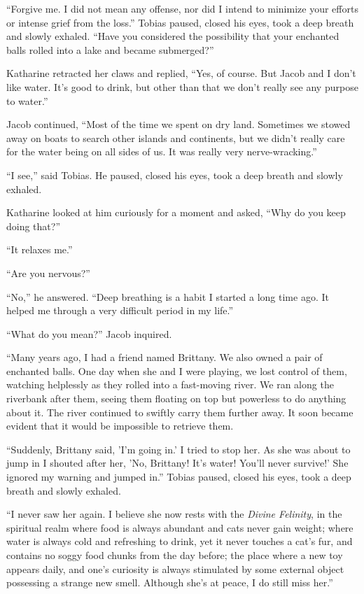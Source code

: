 “Forgive me. I did not mean any offense, nor did I intend to minimize your efforts or intense grief from the loss.” Tobias paused, closed his eyes, took a deep breath and slowly exhaled. “Have you considered the possibility that your enchanted balls rolled into a lake and became submerged?”

Katharine retracted her claws and replied, “Yes, of course. But Jacob and I don't like water. It's good to drink, but other than that we don't really see any purpose to water.”

Jacob continued, “Most of the time we spent on dry land. Sometimes we stowed away on boats to search other islands and continents, but we didn't really care for the water being on all sides of us. It was really very nerve-wracking.”

“I see,” said Tobias. He paused, closed his eyes, took a deep breath and slowly exhaled.

Katharine looked at him curiously for a moment and asked, “Why do you keep doing that?”

“It relaxes me.”

“Are you nervous?”

“No,” he answered. “Deep breathing is a habit I started a long time ago. It helped me through a very difficult period in my life.”

“What do you mean?” Jacob inquired.

“Many years ago, I had a friend named Brittany. We also owned a pair of enchanted balls. One day when she and I were playing, we lost control of them, watching helplessly as they rolled into a fast-moving river. We ran along the riverbank after them, seeing them floating on top but powerless to do anything about it. The river continued to swiftly carry them further away. It soon became evident that it would be impossible to retrieve them.

“Suddenly, Brittany said, 'I'm going in.' I tried to stop her. As she was about to jump in I shouted after her, 'No, Brittany! It's water! You'll never survive!' She ignored my warning and jumped in.” Tobias paused, closed his eyes, took a deep breath and slowly exhaled.

“I never saw her again. I believe she now rests with the \textit{Divine Felinity}, in the spiritual realm where food is always abundant and cats never gain weight; where water is always cold and refreshing to drink, yet it never touches a cat's fur, and contains no soggy food chunks from the day before; the place where a new toy appears daily, and one's curiosity is always stimulated by some external object possessing a strange new smell. Although she's at peace, I do still miss her.”


